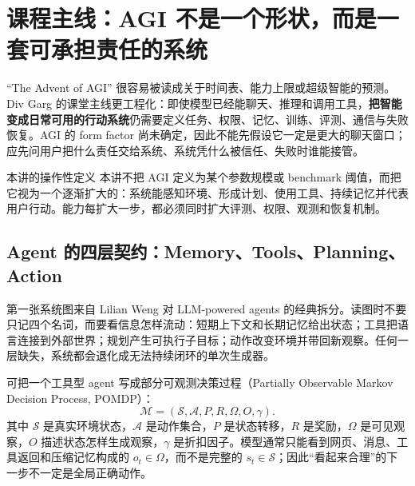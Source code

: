 \section{课程主线：AGI 不是一个形状，而是一套可承担责任的系统}

“The Advent of AGI” 很容易被读成关于时间表、能力上限或超级智能的预测。Div Garg 的课堂主线更工程化：即使模型已经能聊天、推理和调用工具，\textbf{把智能变成日常可用的行动系统}仍需要定义任务、权限、记忆、训练、评测、通信与失败恢复。AGI 的 form factor 尚未确定，因此不能先假设它一定是更大的聊天窗口；应先问用户把什么责任交给系统、系统凭什么被信任、失败时谁能接管。




\begin{importantbox}{本讲的操作性定义}
本讲不把 AGI 定义为某个参数规模或 benchmark 阈值，而把它视为一个逐渐扩大的：系统能感知环境、形成计划、使用工具、持续记忆并代表用户行动。能力每扩大一步，都必须同时扩大评测、权限、观测和恢复机制。
\end{importantbox}

\subsection{Agent 的四层契约：Memory、Tools、Planning、Action}

第一张系统图来自 Lilian Weng 对 LLM-powered agents 的经典拆分。读图时不要只记四个名词，而要看信息怎样流动：短期上下文和长期记忆给出状态；工具把语言连接到外部世界；规划产生可执行子目标；动作改变环境并带回新观察。任何一层缺失，系统都会退化成无法持续闭环的单次生成器。


可把一个工具型 agent 写成部分可观测决策过程（Partially Observable Markov Decision Process, POMDP）：
\[
\mathcal{M}=(\mathcal{S},\mathcal{A},P,R,\Omega,O,\gamma).
\]
其中 $\mathcal{S}$ 是真实环境状态，$\mathcal{A}$ 是动作集合，$P$ 是状态转移，$R$ 是奖励，$\Omega$ 是可见观察，$O$ 描述状态怎样生成观察，$\gamma$ 是折扣因子。模型通常只能看到网页、消息、工具返回和压缩记忆构成的 $o_t\in\Omega$，而不是完整的 $s_t\in\mathcal{S}$；因此“看起来合理”的下一步不一定是全局正确动作。

